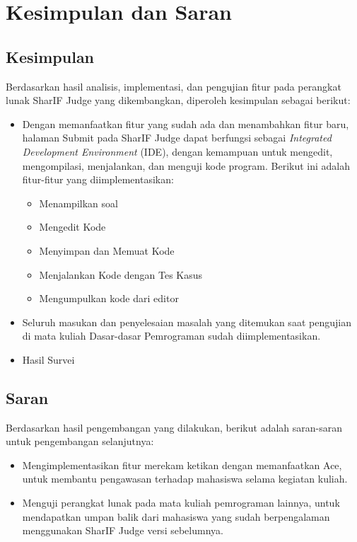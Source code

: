 \chapter{Kesimpulan dan Saran}
\label{chap:kesimpulandansaran}

\section{Kesimpulan}
\label{sec:6:kesimpulan}

Berdasarkan hasil analisis, implementasi, dan pengujian fitur pada perangkat lunak SharIF Judge yang dikembangkan, diperoleh kesimpulan sebagai berikut:

\begin{itemize}
    \item Dengan memanfaatkan fitur yang sudah ada dan menambahkan fitur baru, halaman Submit pada SharIF Judge dapat berfungsi sebagai {\it Integrated Development Environment} (IDE), dengan kemampuan untuk mengedit, mengompilasi, menjalankan, dan menguji kode program. Berikut ini adalah fitur-fitur yang diimplementasikan:
    \begin{itemize}
        \item Menampilkan soal
        \item Mengedit Kode
        \item Menyimpan dan Memuat Kode
        \item Menjalankan Kode dengan Tes Kasus
        \item Mengumpulkan kode dari editor
    \end{itemize}
    
    \item Seluruh masukan dan penyelesaian masalah yang ditemukan saat pengujian di mata kuliah Dasar-dasar Pemrograman sudah diimplementasikan.
    
    \item Hasil Survei
\end{itemize}

\section{Saran}
\label{sec:6:saran}

Berdasarkan hasil pengembangan yang dilakukan, berikut adalah saran-saran untuk pengembangan selanjutnya:

\begin{itemize}
    \item Mengimplementasikan fitur merekam ketikan dengan memanfaatkan Ace, untuk membantu pengawasan terhadap mahasiswa selama kegiatan kuliah.
    \item Menguji perangkat lunak pada mata kuliah pemrograman lainnya, untuk mendapatkan umpan balik dari mahasiswa yang sudah berpengalaman menggunakan SharIF Judge versi sebelumnya.
\end{itemize}